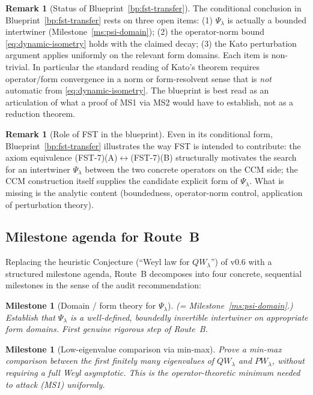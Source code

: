 \documentclass[11pt,a4paper]{article}
\theoremstyle{plain}
\newtheorem{milestone}[theorem]{Milestone}
\theoremstyle{definition}
\newtheorem{remark}[theorem]{Remark}
\begin{document}
\begin{remark}[Status of Blueprint~\ref{bp:fst-transfer}]
\label{rem:blueprint-caveats}
The conditional conclusion in Blueprint~\ref{bp:fst-transfer} rests
on three open items: (1) $\Psi_\lambda$ is actually a bounded
intertwiner (Milestone~\ref{ms:psi-domain}); (2) the operator-norm
bound \eqref{eq:dynamic-isometry} holds with the claimed decay; (3)
the Kato perturbation argument applies uniformly on the relevant
form domains.  Each item is non-trivial.  In particular the
standard reading of Kato's theorem requires operator/form
convergence in a norm or form-resolvent sense that is \emph{not}
automatic from \eqref{eq:dynamic-isometry}.  The blueprint is best
read as an articulation of what a proof of MS1 via MS2 would have to
establish, not as a reduction theorem.
\end{remark}

\begin{remark}[Role of FST in the blueprint]\label{rem:fst-contribution}
Even in its conditional form, Blueprint~\ref{bp:fst-transfer}
illustrates the way FST is intended to contribute: the axiom
equivalence (FST-7)(A)$\leftrightarrow$(FST-7)(B) structurally
motivates the search for an intertwiner $\Psi_\lambda$ between the
two concrete operators on the CCM side; the CCM construction itself
supplies the candidate explicit form of $\Psi_\lambda$.  What is
missing is the analytic content (boundedness, operator-norm
control, application of perturbation theory).
\end{remark}

\subsection{Milestone agenda for Route~B}
\label{sec:route-b-milestones}

Replacing the heuristic Conjecture (``Weyl law for $QW_\lambda$'') of
v0.6 with a structured milestone agenda, Route~B decomposes into
four concrete, sequential milestones in the sense of the audit
recommendation:

\begin{milestone}[Domain / form theory for $\Psi_\lambda$]
\label{ms:1}
(= Milestone~\ref{ms:psi-domain}.) Establish that $\Psi_\lambda$ is
a well-defined, boundedly invertible intertwiner on appropriate
form domains.  First genuine rigorous step of Route~B.
\end{milestone}

\begin{milestone}[Low-eigenvalue comparison via min-max]
\label{ms:2}
Prove a min-max comparison between the first finitely many
eigenvalues of $QW_\lambda$ and $PW_\lambda$, \emph{without}
requiring a full Weyl asymptotic.  This is the operator-theoretic
minimum needed to attack (MS1) uniformly.
\end{milestone}
\end{document}
